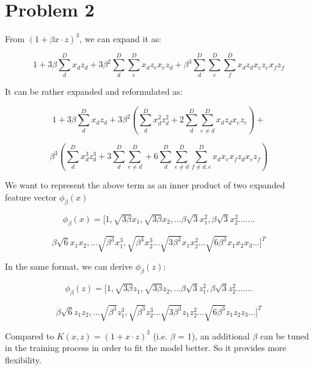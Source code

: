 \documentclass[11pt]{article}
\newcommand{\solution}[1]{{{\color{black}{\bf Solution:} {#1}}}}
\begin{document}
\vspace{5cm}

\newpage~\newpage~\newpage

\section{Problem 2}

\solution{From $(1+\beta x \cdot z)^3$, we can expand it as:

$$ 1+3\beta\sum_{d}^{D} x_dz_d + 3\beta^2\sum_{d}^{D}\sum_{e}^{D} x_dz_ex_ez_d +\beta^3\sum_{d}^{D}\sum_{e}^{D}\sum_{f}^{D} x_dz_dx_ez_ex_fz_f$$

It can be rather expanded and reformulated as:

$$ 1+3\beta\sum_{d}^{D} x_dz_d + 3\beta^2(\sum_{d}^{D}x_d^2z_d^2 + 2\sum_{d}^{D}\sum_{e\neq d}^{D}x_dz_dx_ez_e) + $$

$$ \beta^3(\sum_{d}^{D}x_d^3z_d^3 + 3\sum_{d}^{D}\sum_{e\neq d}^{D} + 6\sum_{d}^{D}\sum_{e\neq d}^{D}\sum_{f\neq d, e}^{D} x_dx_ex_fz_dx_ez_f)$$


We want to represent the above term as an inner product of two expanded feature vector $\phi_\beta(x)$

$$\phi_\beta(x) = [1, \sqrt{3\beta}x_1, \sqrt{3\beta}x_2, ...\beta\sqrt{3}x_1^2, \beta\sqrt{3}x_2^2.......$$

$$\beta\sqrt{6}x_1x_2, ...\sqrt{\beta^3}x_1^3, \sqrt{\beta^3}x_2^3 ... \sqrt{3\beta^3}x_1x_2^2...\sqrt{6\beta^3}x_1x_2x_3...]^T$$

In the same format, we can derive $\phi_\beta(z)$:

$$\phi_\beta(z) = [1, \sqrt{3\beta}z_1, \sqrt{3\beta}z_2, ...\beta\sqrt{3}z_1^2, \beta\sqrt{3}z_2^2.......$$

$$\beta\sqrt{6}z_1z_2, ...\sqrt{\beta^3}z_1^3, \sqrt{\beta^3}z_2^3 ... \sqrt{3\beta^3}z_1z_2^2...\sqrt{6\beta^3}z_1z_2z_3...]^T$$

Compared to $K(x, z) = (1+x \cdot z)^3$ (i.e. $\beta$ = 1), an additional $\beta$ can be tuned in the training process in order to fit the model better. So it provides more flexibility.



}

\vspace{5cm}
\newpage
\end{document}
